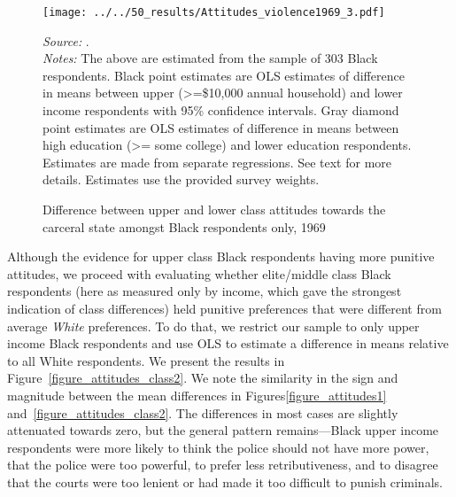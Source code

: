 \documentclass[12pt]{article}
\begin{document}
\begin{figure}[h!]
 \begin{center}
 \caption{Difference between upper and lower class attitudes towards the carceral state amongst Black respondents only, 1969}
 \small
		 \texttt{[image: ../../50\_results/Attitudes\_violence1969\_3.pdf]}
 \label{figure_attitudes2}
 	\end{center}
 	{\scriptsize{\emph{Source:} . }} \\
	{\scriptsize{\emph{Notes:} The above are estimated from the sample of 303 Black respondents.  Black point estimates are OLS estimates of difference in means between upper (>=\$10,000 annual household) and lower income respondents with 95\% confidence intervals. Gray diamond point estimates are OLS estimates of difference in means between high education (>= some college) and lower education respondents.  Estimates are made from separate regressions.  See text for more details.  Estimates use the provided survey weights.  \singlespacing }}
\end{figure} \normalsize

Although the evidence for upper class Black respondents having more punitive attitudes, we proceed with evaluating whether elite/middle class Black respondents (here as measured only by income, which gave the strongest indication of class differences) held punitive preferences that were different from average \emph{White} preferences.  To do that, we restrict our sample to only upper income Black respondents and use OLS to estimate a difference in means relative to all White respondents.  We present the results in Figure~\ref{figure_attitudes_class2}.  We note the similarity in the sign and magnitude between the mean differences in Figures\ref{figure_attitudes1} and~\ref{figure_attitudes_class2}.  The differences in most cases are slightly attenuated towards zero, but the general pattern remains---Black upper income respondents were more likely to think the police should not have more power, that the police were too powerful, to prefer less retributiveness, and to disagree that the courts were too lenient or had made it too difficult to punish criminals.
\end{document}
